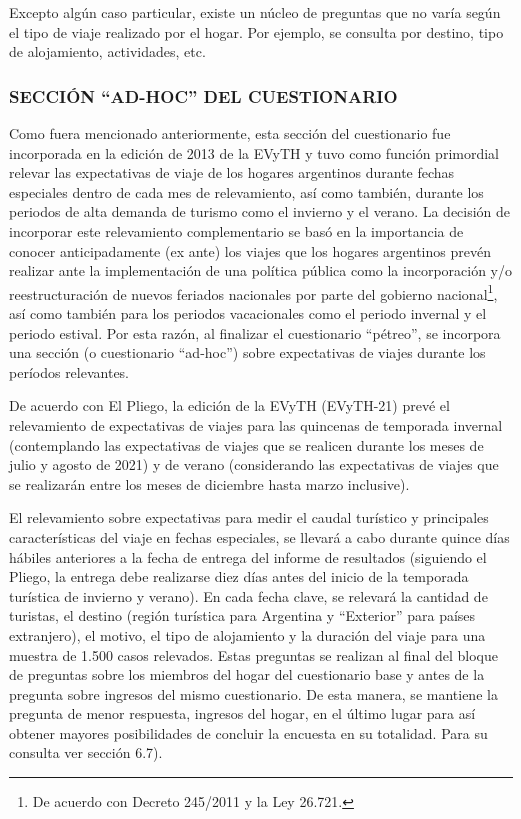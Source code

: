 \documentclass[
  openany]{book}
\begin{document}
Excepto algún caso particular, existe un núcleo de preguntas que no varía según el tipo de viaje realizado por el hogar.
Por ejemplo, se consulta por destino, tipo de alojamiento, actividades, etc.

\hypertarget{secciuxf3n-ad-hoc-del-cuestionario}{%
\subsubsection{\texorpdfstring{\textbf{SECCIÓN ``AD-HOC'' DEL CUESTIONARIO}}{SECCIÓN ``AD-HOC'' DEL CUESTIONARIO}}\label{secciuxf3n-ad-hoc-del-cuestionario}}

Como fuera mencionado anteriormente, esta sección del cuestionario fue incorporada en la edición de 2013 de la EVyTH y tuvo como función primordial relevar las expectativas de viaje de los hogares argentinos durante fechas especiales dentro de cada mes de relevamiento, así como también, durante los periodos de alta demanda de turismo como el invierno y el verano.
La decisión de incorporar este relevamiento complementario se basó en la importancia de conocer anticipadamente (ex ante) los viajes que los hogares argentinos prevén realizar ante la implementación de una política pública como la incorporación y/o reestructuración de nuevos feriados nacionales por parte del gobierno nacional\footnote{De acuerdo con Decreto 245/2011 y la Ley 26.721.}, así como también para los periodos vacacionales como el periodo invernal y el periodo estival.
Por esta razón, al finalizar el cuestionario ``pétreo'', se incorpora una sección (o cuestionario ``ad-hoc'') sobre expectativas de viajes durante los períodos relevantes.

De acuerdo con El Pliego, la edición de la EVyTH (EVyTH-21) prevé el relevamiento de expectativas de viajes para las quincenas de temporada invernal (contemplando las expectativas de viajes que se realicen durante los meses de julio y agosto de 2021) y de verano (considerando las expectativas de viajes que se realizarán entre los meses de diciembre hasta marzo inclusive).

El relevamiento sobre expectativas para medir el caudal turístico y principales características del viaje en fechas especiales, se llevará a cabo durante quince días hábiles anteriores a la fecha de entrega del informe de resultados (siguiendo el Pliego, la entrega debe realizarse diez días antes del inicio de la temporada turística de invierno y verano).
En cada fecha clave, se relevará la cantidad de turistas, el destino (región turística para Argentina y ``Exterior'' para países extranjero), el motivo, el tipo de alojamiento y la duración del viaje para una muestra de 1.500 casos relevados.
Estas preguntas se realizan al final del bloque de preguntas sobre los miembros del hogar del cuestionario base y antes de la pregunta sobre ingresos del mismo cuestionario.
De esta manera, se mantiene la pregunta de menor respuesta, ingresos del hogar, en el último lugar para así obtener mayores posibilidades de concluir la encuesta en su totalidad.
Para su consulta ver sección 6.7).
\end{document}
